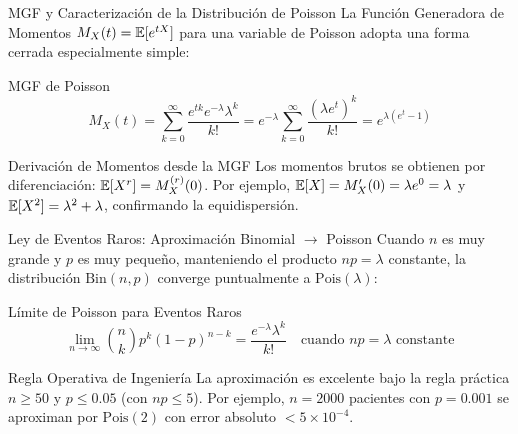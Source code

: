 \documentclass[10pt, aspectratio=169]{beamer}
\begin{document}
\begin{frame}{MGF y Caracterización de la Distribución de Poisson}
  \footnotesize
  La Función Generadora de Momentos $M_{X}(t) = \mathbb{E}[e^{tX}]$ para una variable de Poisson adopta una forma cerrada especialmente simple: \pause

  \vspace{0.1cm}
  \begin{block}{MGF de Poisson}
    $$M_{X}(t) = \sum_{k=0}^{\infty} \dfrac{e^{tk} e^{-\lambda} \lambda^{k}}{k!} = e^{-\lambda} \sum_{k=0}^{\infty} \dfrac{(\lambda e^{t})^{k}}{k!} = e^{\lambda(e^{t} - 1)}$$
  \end{block}

  \vspace{0.1cm}
  \pause
  \begin{alertblock}{Derivación de Momentos desde la MGF}
    Los momentos brutos se obtienen por diferenciación: $\mathbb{E}[X^{r}] = M_{X}^{(r)}(0)$. Por ejemplo, $\mathbb{E}[X] = M_{X}'(0) = \lambda e^{0} = \lambda$ y $\mathbb{E}[X^{2}] = \lambda^{2} + \lambda$, confirmando la equidispersión.
  \end{alertblock}
\end{frame}

\begin{frame}{Ley de Eventos Raros: Aproximación Binomial $\to$ Poisson}
  \footnotesize
  Cuando $n$ es muy grande y $p$ es muy pequeño, manteniendo el producto $np = \lambda$ constante, la distribución $\text{Bin}(n, p)$ converge puntualmente a $\text{Pois}(\lambda)$: \pause

  \vspace{0.1cm}
  \begin{block}{Límite de Poisson para Eventos Raros}
    $$\lim_{n \to \infty} \binom{n}{k} p^{k} (1-p)^{n-k} = \dfrac{e^{-\lambda} \lambda^{k}}{k!} \quad \text{cuando } np = \lambda \text{ constante}$$
  \end{block}

  \vspace{0.1cm}
  \pause
  \begin{alertblock}{Regla Operativa de Ingeniería}
    La aproximación es excelente bajo la regla práctica $n \ge 50$ y $p \le 0.05$ (con $np \le 5$). Por ejemplo, $n = 2000$ pacientes con $p = 0.001$ se aproximan por $\text{Pois}(2)$ con error absoluto $< 5 \times 10^{-4}$.
  \end{alertblock}
\end{frame}
\end{document}
